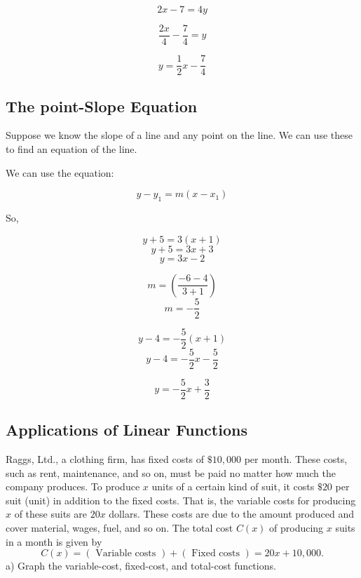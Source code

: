 \documentclass{report}
\begin{document}
$$2x-7=4y$$

$$\frac{2x}{4} - \frac{7}{4} = y$$

$$y = \frac{1}{2}x - \frac{7}{4}$$

\pagebreak
\subsection{The point-Slope Equation}
\bigbreak \noindent
Suppose we know the slope of a line and any point on the line. We can use these to find an equation of the line.
\bigbreak \noindent \bigbreak \noindent
{}
\bigbreak \noindent
\sol{}
\bigbreak 
\begin{mdframed}
We can use the equation:

$$ y-y_1 = m(x-x_1)$$
\vspace{2mm}

So,

$$ y + 5 = 3(x + 1 )$$
$$ y + 5 = 3x + 3$$ 
$$ y = 3x - 2 $$
\end{mdframed}
\bigbreak \noindent \bigbreak \noindent
{}
\bigbreak \noindent \bigbreak \noindent
{}
\bigbreak \noindent
\sol{}
\bigbreak
$$ m = \left(\frac{-6-4}{3+1}\right)$$
$$ m = -\frac{5}{2}$$

$$ y-4 = -\frac{5}{2}(x+1)$$
$$ y - 4 = -\frac{5}{2}x - \frac{5}{2}$$

$$ y=-\frac{5}{2}x +\frac{3}{2}$$
\pagebreak
\subsection{Applications of Linear Functions}
\bigbreak \noindent
Raggs, Ltd., a clothing firm, has fixed costs of $\$ 10,000$ per month. These costs, such as rent, maintenance, and so on, must be paid no matter how much the company produces. To produce $x$ units of a certain kind of suit, it costs $\$ 20$ per suit (unit) in addition to the fixed costs. That is, the variable costs for producing $x$ of these suits are $20 x$ dollars. These costs are due to the amount produced and cover material, wages, fuel, and so on. The total cost $C(x)$ of producing $x$ suits in a month is given by
$$
C(x)=(\text { Variable costs })+(\text { Fixed costs })=20 x+10,000 .
$$
\bigbreak
\noindent a) Graph the variable-cost, fixed-cost, and total-cost functions.
\vspace{2mm}
\end{document}
